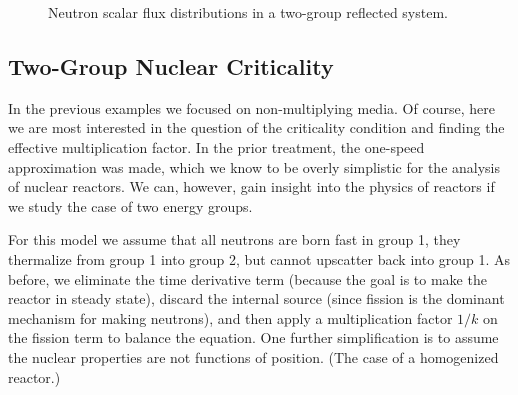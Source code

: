\begin{figure}[tb!]
\begin{center}
\caption{Neutron scalar flux distributions in a two-group reflected system.}
 \label{Fig:neutronics_twoGroupReflectedReactor_ScalarFlux}
\end{center}
\end{figure}

\subsection{Two-Group Nuclear Criticality}

In the previous examples we focused on non-multiplying media. Of course, here we are most interested in the question of the criticality condition and finding the effective multiplication factor. In the prior treatment, the one-speed approximation was made, which we know to be overly simplistic for the analysis of nuclear reactors. We can, however, gain insight into the physics of reactors if we study the case of two energy groups. 

For this model we assume that all neutrons are born fast in group 1, they thermalize from group 1 into group 2, but cannot upscatter back into group 1. As before, we eliminate the time derivative term (because the goal is to make the reactor in steady state), discard the internal source (since fission is the dominant mechanism for making neutrons), and then apply a multiplication factor $1/k$ on the fission term to balance the equation. One further simplification is to assume the nuclear properties are not functions of position. (The case of a homogenized reactor.)

